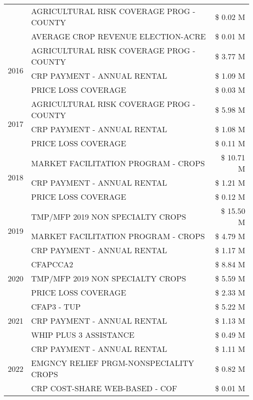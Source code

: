\begin{tabular}{llr}
 & AGRICULTURAL RISK COVERAGE PROG - COUNTY & \$ 0.02 M \\
 & AVERAGE CROP REVENUE ELECTION-ACRE & \$ 0.01 M \\
\cline{1-3}
\multirow[t]{3}{*}{2016} & AGRICULTURAL RISK COVERAGE PROG - COUNTY & \$ 3.77 M \\
 & CRP PAYMENT - ANNUAL RENTAL & \$ 1.09 M \\
 & PRICE LOSS COVERAGE & \$ 0.03 M \\
\cline{1-3}
\multirow[t]{3}{*}{2017} & AGRICULTURAL RISK COVERAGE PROG - COUNTY & \$ 5.98 M \\
 & CRP PAYMENT - ANNUAL RENTAL & \$ 1.08 M \\
 & PRICE LOSS COVERAGE & \$ 0.11 M \\
\cline{1-3}
\multirow[t]{3}{*}{2018} & MARKET FACILITATION PROGRAM - CROPS & \$ 10.71 M \\
 & CRP PAYMENT - ANNUAL RENTAL & \$ 1.21 M \\
 & PRICE LOSS COVERAGE & \$ 0.12 M \\
\cline{1-3}
\multirow[t]{3}{*}{2019} & TMP/MFP 2019 NON SPECIALTY CROPS & \$ 15.50 M \\
 & MARKET FACILITATION PROGRAM - CROPS & \$ 4.79 M \\
 & CRP PAYMENT - ANNUAL RENTAL & \$ 1.17 M \\
\cline{1-3}
\multirow[t]{3}{*}{2020} & CFAPCCA2 & \$ 8.84 M \\
 & TMP/MFP 2019 NON SPECIALTY CROPS & \$ 5.59 M \\
 & PRICE LOSS COVERAGE & \$ 2.33 M \\
\cline{1-3}
\multirow[t]{3}{*}{2021} & CFAP3 - TUP & \$ 5.22 M \\
 & CRP PAYMENT - ANNUAL RENTAL & \$ 1.13 M \\
 & WHIP PLUS 3 ASSISTANCE & \$ 0.49 M \\
\cline{1-3}
\multirow[t]{3}{*}{2022} & CRP PAYMENT - ANNUAL RENTAL & \$ 1.11 M \\
 & EMGNCY RELIEF PRGM-NONSPECIALITY CROPS & \$ 0.82 M \\
 & CRP COST-SHARE WEB-BASED - COF & \$ 0.01 M \\
\cline{1-3}
\bottomrule
\end{tabular}
